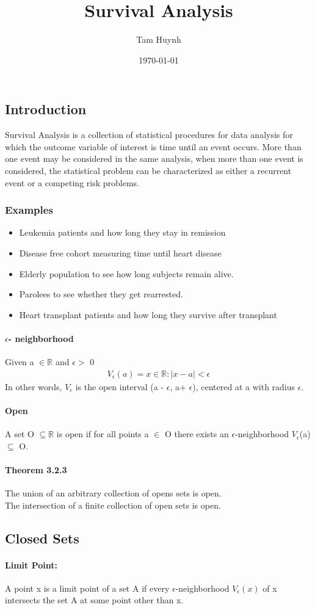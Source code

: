 \documentclass{article}
\title{Survival Analysis}
\date{\today}
\author{Tam Huynh}
\newcommand*{\R}{\mathbb{R}}
\newcommand*{\subsetR}{$\subseteq \R $}
\newcommand*{\eps}{$\epsilon$}
\begin{document}
\setcounter{secnumdepth}{0} %

	\maketitle
	\subsection{Introduction}
	Survival Analysis is a collection of statistical procedures for data analysis for which the outcome variable of interest is time until an event occurs.
	More than one event may be considered in the same analysis, when more than one event is considered, the statistical problem can be characterized as either a recurrent event or a competing risk problems.  
	\subsubsection{Examples}
		\begin{itemize}
			\item Leukemia patients and how long they stay in remission
			\item Disease free cohort measuring time until heart disease
			\item Elderly population to see how long subjects remain alive.
			\item Parolees to see whether they get rearrested.
			\item Heart transplant patients and how long they survive after transplant
		\end{itemize}
		
	
	\paragraph{$\epsilon$- neighborhood}
	Given a $\in \R$ and \eps $ >$ 0
	\begin{align*}
	V_{\epsilon}(a) = {x \in \R: |x-a| < \epsilon}
	\end{align*}
	In other words, $V_{\epsilon}$ is the open interval (a - $\epsilon$, a+ $\epsilon$), centered at a with radius $\epsilon$.
	\paragraph{Open}
	A set O \subsetR  $ $ is open if for all points a $\in$ O there exists an \eps-neighborhood $V_{\epsilon}$(a) $\subseteq$ O.
	\paragraph{Theorem 3.2.3}
	The union of an arbitrary collection of opens sets is open.\\
	The intersection of a finite collection of open sets is open.
	
	\subsection{Closed Sets}
	
	\paragraph{Limit Point:}
	A point x is a limit point of a set A if every $\epsilon$-neighborhood $V_{\epsilon}(x)$ of x 	intersects the set A at some point other than x.

	
	

	
	
	
	
\end{document}
